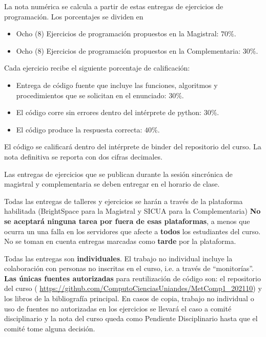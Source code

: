 \documentclass[letterpaper,10pt,onecolumn]{article}
\begin{document}
La nota num\'erica se calcula a partir de estas entregas de ejercicios de
programaci\'on. Los porcentajes se dividen en

\begin{itemize}
    \item Ocho (8) Ejercicios de programaci\'on propuestos en la
      Magistral: $70\%$.
    \item Ocho (8) Ejercicios de programaci\'on propuestos en la
      Complementaria: $30\%$.  
\end{itemize}


Cada ejercicio recibe el siguiente porcentaje de calificaci\'on:
\begin{itemize}
\item Entrega de c\'odigo fuente que incluye las funciones, algoritmos
  y procedimientos que se solicitan en el enunciado: $30\%$.  
\item El c\'odigo corre sin errores dentro del int\'erprete de python: $30\%$.
\item El c\'odigo produce la respuesta correcta: $40\%$.
\end{itemize}
El c\'odigo se calificar\'a dentro del int\'erprete de binder del
repositorio del curso.
La nota definitiva se reporta con dos cifras decimales.

Las entregas de ejercicios que se publican durante la sesi\'on
sincr\'onica de magistral y complementaria se deben entregar en el horario de clase. 


Todas las entregas de talleres y ejercicios se har\'an a trav\'es de 
la plataforma habilitada (BrightSpace para la Magistral y SICUA para
la Complementaria)
{\bf No se aceptar\'a ninguna tarea por fuera de esas plataformas}, a
menos que ocurra un una falla en los servidores que afecte a {\bf todos} los
estudiantes del curso. 
No se toman en cuenta entregas marcadas como {\bf tarde} por la plataforma. 

Todas las entregas son \textbf{individuales}.  
El trabajo no individual incluye la colaboraci\'on con
personas no inscritas en el curso, i.e. a 
trav\'es de ``monitor\'ias''.
\textbf{Las \'unicas fuentes autorizadas} para reutilizaci\'on de c\'odigo son:
el repositorio del curso (
\url{https://github.com/ComputoCienciasUniandes/MetComp1_202110}) y
los libros de la bibliograf\'ia principal.
En casos de copia, trabajo no individual o uso de fuentes no
autorizadas en los ejercicios se llevar\'a el caso a comit\'e
disciplinario y la nota del curso queda como Pendiente Disciplinario
hasta que el comit\'e tome alguna decisi\'on. 
\end{document}
